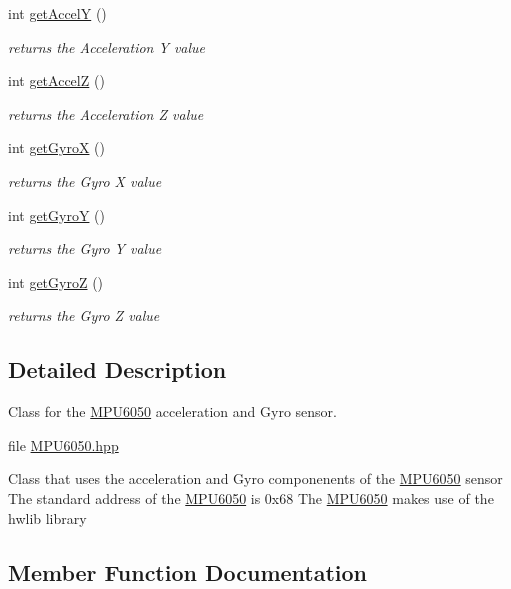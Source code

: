\begin{DoxyCompactItemize}
int \hyperlink{classMPU6050_a7314be9b929224469f3c3d1bd81a6247}{get\+AccelY} ()
\begin{DoxyCompactList}\small\item\em returns the Acceleration Y value \end{DoxyCompactList}\item 
int \hyperlink{classMPU6050_a6c60f7d16a251a17c3ffc6a5c98ce1d6}{get\+AccelZ} ()
\begin{DoxyCompactList}\small\item\em returns the Acceleration Z value \end{DoxyCompactList}\item 
int \hyperlink{classMPU6050_a093f4156b743539f1d399a1965fb2ca0}{get\+GyroX} ()
\begin{DoxyCompactList}\small\item\em returns the Gyro X value \end{DoxyCompactList}\item 
int \hyperlink{classMPU6050_a3b677f1d55c966978eeffa560839c3cd}{get\+GyroY} ()
\begin{DoxyCompactList}\small\item\em returns the Gyro Y value \end{DoxyCompactList}\item 
int \hyperlink{classMPU6050_ade58d79092bf5311984e39c4cdae2f7b}{get\+GyroZ} ()
\begin{DoxyCompactList}\small\item\em returns the Gyro Z value \end{DoxyCompactList}\end{DoxyCompactItemize}


\subsection{Detailed Description}
Class for the \hyperlink{classMPU6050}{M\+P\+U6050} acceleration and Gyro sensor. 

file \hyperlink{MPU6050_8hpp_source}{M\+P\+U6050.\+hpp}

Class that uses the acceleration and Gyro componenents of the \hyperlink{classMPU6050}{M\+P\+U6050} sensor The standard address of the \hyperlink{classMPU6050}{M\+P\+U6050} is 0x68 The \hyperlink{classMPU6050}{M\+P\+U6050} makes use of the hwlib library 

\subsection{Member Function Documentation}
\mbox{\label{classMPU6050_a4078364234bcadc11c3872dfad80525b}} 
